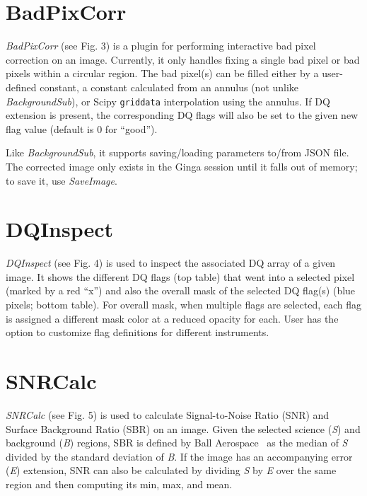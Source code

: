 \documentclass[11pt,twoside]{article}
\begin{document}
\section{BadPixCorr}


{\em BadPixCorr} (see Fig. 3) is a plugin for performing interactive bad pixel
correction on an image. Currently, it only handles fixing a single bad pixel or
bad pixels within a circular region.
The bad pixel(s) can be filled either by a user-defined constant, a constant
calculated from an annulus (not unlike {\em BackgroundSub}), or Scipy
{\tt griddata} interpolation using the annulus.
If DQ extension is present, the corresponding DQ flags will also be set
to the given new flag value (default is 0 for ``good'').

Like {\em BackgroundSub}, it supports saving/loading parameters to/from
JSON file. The corrected image only exists in the Ginga session until it
falls out of memory; to save it, use {\em SaveImage}.

\section{DQInspect}


{\em DQInspect} (see Fig. 4) is used to inspect the associated DQ array of a
given image.
It shows the different DQ flags (top table) that went into a selected pixel
(marked by a red ``x'')
and also the overall mask of the selected DQ flag(s)
(blue pixels; bottom table).
For overall mask, when multiple flags are selected, each flag is assigned a
different mask color at a reduced opacity for each.
User has the option to customize flag definitions for different instruments.

\section{SNRCalc}

{\em SNRCalc} (see Fig. 5) is used to calculate Signal-to-Noise Ratio (SNR) and
Surface Background Ratio (SBR) on an image.
Given the selected science ({\em S}) and background ({\em B}) regions,
SBR is defined by Ball Aerospace~\citep*{sbr} as the median of {\em S}
divided by the standard deviation of {\em B}.
If the image has an accompanying error ({\em E}) extension, SNR can also
be calculated by dividing {\em S} by {\em E} over the same region and
then computing its min, max, and mean.
\end{document}
